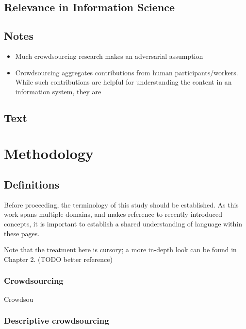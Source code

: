 \subsection{Relevance in Information
Science}\label{relevance-in-information-science}

\subsection{Notes}\label{notes-2}

\begin{itemize}
\item
  Much crowdsourcing research makes an adversarial assumption
\item
  Crowdsourcing aggregates contributions from human
  participants/workers. While such contributions are helpful for
  understanding the content in an information system, they are
\end{itemize}

\subsection{Text}\label{text}

\section{Methodology}\label{methodology}

\subsection{Definitions}\label{definitions}

Before proceeding, the terminology of this study should be established.
As this work spans multiple domains, and makes reference to recently
introduced concepts, it is important to establish a shared understanding
of language within these pages.

Note that the treatment here is cursory; a more in-depth look can be
found in Chapter 2. (TODO better reference)

\subsubsection{Crowdsourcing}\label{crowdsourcing}

Crowdsou

\subsubsection{Descriptive
crowdsourcing}\label{descriptive-crowdsourcing}

